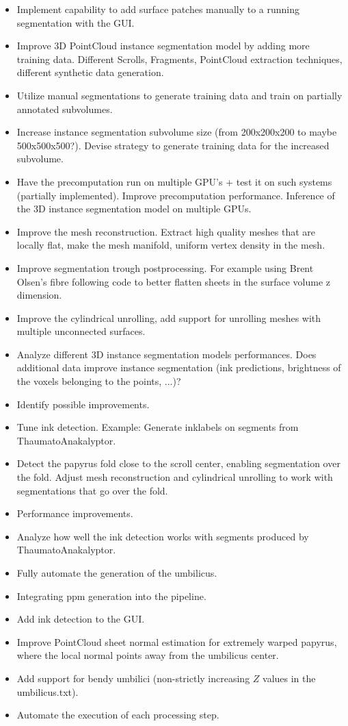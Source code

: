 \documentclass[peerreview]{IEEEtran}
\begin{document}
\begin{itemize}
\item Implement capability to add surface patches manually to a running segmentation with the GUI.
\item Improve 3D PointCloud instance segmentation model by adding more training data. Different Scrolls, Fragments, PointCloud extraction techniques, different synthetic data generation.
\item Utilize manual segmentations to generate training data and train on partially annotated subvolumes.
\item Increase instance segmentation subvolume size (from 200x200x200 to maybe 500x500x500?). Devise strategy to generate training data for the increased subvolume.
\item Have the precomputation run on multiple GPU's + test it on such systems (partially implemented). Improve precomputation performance. Inference of the 3D instance segmentation model on multiple GPUs.
\item Improve the mesh reconstruction. Extract high quality meshes that are locally flat, make the mesh manifold, uniform vertex density in the mesh.
\item Improve segmentation trough postprocessing. For example using Brent Olsen's fibre following code to better flatten sheets in the surface volume z dimension.
\item Improve the cylindrical unrolling, add support for unrolling meshes with multiple unconnected surfaces.
\item Analyze different 3D instance segmentation models performances. Does additional data improve instance segmentation (ink predictions, brightness of the voxels belonging to the points, ...)?
\item Identify possible improvements.
\item Tune ink detection. Example: Generate inklabels on segments from ThaumatoAnakalyptor.
\item Detect the papyrus fold close to the scroll center, enabling segmentation over the fold. Adjust mesh reconstruction and cylindrical unrolling to work with segmentations that go over the fold.
\item Performance improvements.
\item Analyze how well the ink detection works with segments produced by ThaumatoAnakalyptor. 
\item Fully automate the generation of the umbilicus.
\item Integrating ppm generation into the pipeline.
\item Add ink detection to the GUI.
\item Improve PointCloud sheet normal estimation for extremely warped papyrus, where the local normal points away from the umbilicus center.
\item Add support for bendy umbilici (non-strictly increasing $Z$ values in the umbilicus.txt).
\item Automate the execution of each processing step.
\end{itemize}
\end{document}
